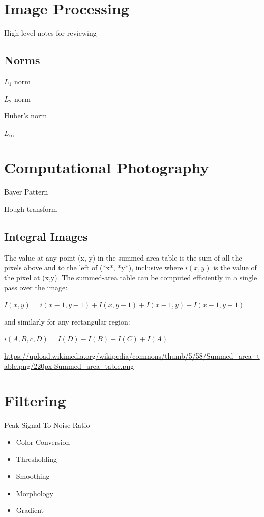 \section{Image Processing}

High level notes for reviewing

\subsection[]{Norms}


$L_1$ norm

$L_2$ norm

Huber’s norm

$L_\infty $


\section{Computational Photography}

Bayer Pattern

Hough transform

 



\subsection{Integral Images}


The value at any point (x, y) in the summed-area table is the sum of all the pixels above and to the left of (*x*, *y*), inclusive where $i(x,y)$  is the value of the pixel at (x,y). The summed-area table can be computed efficiently in a single pass over the image:

$I(x,y) = i(x-1,y-1) + I(x,y-1) + I(x-1,y)-I(x-1,y-1)$

and similarly for any rectangular region:

$ i(A,B,c,D) = I(D) - I(B) - I(C)+I(A)$

\url{https://upload.wikimedia.org/wikipedia/commons/thumb/5/58/Summed_area_table.png/220px-Summed_area_table.png}

\section{ Filtering}

Peak Signal To Noise Ratio 



\begin{itemize}
\item Color Conversion
\item Thresholding
\item Smoothing
\item Morphology
\item Gradient
\end{itemize}

